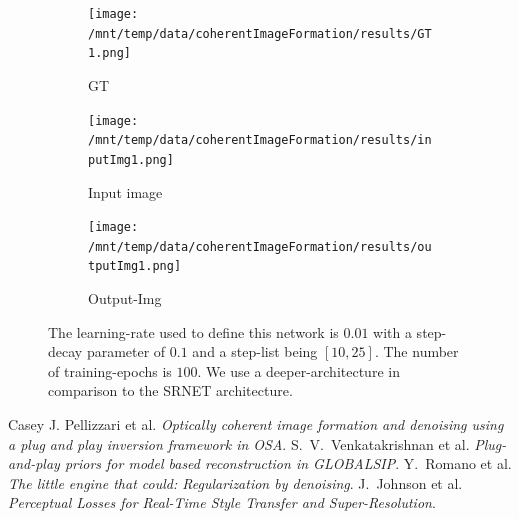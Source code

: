 \documentclass[a4paper, 11pt]{article}
\begin{document}
\begin{figure}[!h]
\centering
\begin{subfigure}[b]{0.22\textwidth}
        \texttt{[image: /mnt/temp/data/coherentImageFormation/results/GT1.png]}
        \caption{GT}
        \label{fig:GT}
    \end{subfigure}
    \begin{subfigure}[b]{0.22\textwidth}
        \texttt{[image: /mnt/temp/data/coherentImageFormation/results/inputImg1.png]}
        \caption{Input image}
        \label{fig:inputImg}
    \end{subfigure}
    \begin{subfigure}[b]{0.22\textwidth}
        \texttt{[image: /mnt/temp/data/coherentImageFormation/results/outputImg1.png]}
        \caption{Output-Img}
        \label{fig:outputImg}
    \end{subfigure}
\caption{The learning-rate used to define this network is $0.01$ with a step-decay parameter of $0.1$ and a step-list being $[10, 25]$. The number of training-epochs is $100$. We use a deeper-architecture in comparison to the SRNET architecture.}
\label{fig:outputFig}
\end{figure}

\begin{thebibliography}{9}
 Casey J. Pellizzari et al. \emph{Optically coherent image formation and denoising using a plug and play inversion framework in OSA}.
 S.~V.~Venkatakrishnan et al. \emph{Plug-and-play priors for model based reconstruction in GLOBALSIP}.
 Y.~Romano et al. \emph{The little engine that could: Regularization by denoising}.
 J.~Johnson et al. \emph{Perceptual Losses for Real-Time Style Transfer and Super-Resolution}.
\end{thebibliography}
\end{document}

